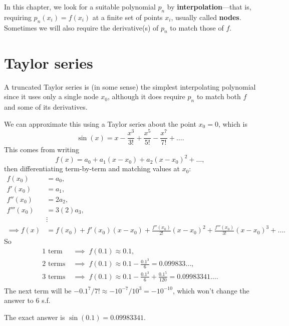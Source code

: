\documentclass[
  letterpaper,
  DIV=11,
  numbers=noendperiod]{scrreprt}
\begin{document}
In this chapter, we look for a suitable polynomial \(p_n\) by
\textbf{interpolation}---that is, requiring \(p_n(x_i) = f(x_i)\) at a
finite set of points \(x_i\), usually called \textbf{nodes}. Sometimes
we will also require the derivative(s) of \(p_n\) to match those of
\(f\).

\section*{Taylor series}\label{taylor-series}


A truncated Taylor series is (in some sense) the simplest interpolating
polynomial since it uses only a single node \(x_0\), although it does
require \(p_n\) to match both \(f\) and some of its derivatives.

We can approximate this using a Taylor series about the point \(x_0=0\),
which is \[
\sin(x) = x - \frac{x^3}{3!} + \frac{x^5}{5!} - \frac{x^7}{7!} + \ldots.
\] This comes from writing \[
f(x) = a_0 + a_1(x-x_0) + a_2(x-x_0)^2 + \ldots,
\] then differentiating term-by-term and matching values at \(x_0\):
\begin{align*}
f(x_0) &= a_0,\\
f'(x_0) &= a_1,\\
f''(x_0) &= 2a_2,\\
f'''(x_0) &= 3(2)a_3,\\
&\vdots\\
\implies f(x) &= f(x_0) + f'(x_0)(x-x_0) + \frac{f''(x_0)}{2!}(x-x_0)^2 + \frac{f'''(x_0)}{3!}(x-x_0)^3 + \ldots.
\end{align*} So \begin{align*}
\textrm{1 term} \;&\implies\; f(0.1) \approx 0.1,\\
\textrm{2 terms} \;&\implies\; f(0.1) \approx 0.1 - \frac{0.1^3}{6} = 0.099833\ldots,\\
\textrm{3 terms} \;&\implies\; f(0.1) \approx 0.1 - \frac{0.1^3}{6} + \frac{0.1^5}{120} = 0.09983341\ldots.\\
\end{align*} The next term will be
\(-0.1^7/7! \approx -10^{-7}/10^3 = -10^{-10}\), which won't change the
answer to 6 s.f.

\begin{tcolorbox}[enhanced jigsaw, arc=.35mm, toprule=.15mm, colframe=quarto-callout-note-color-frame, left=2mm, toptitle=1mm, titlerule=0mm, breakable, opacityback=0, bottomtitle=1mm, title=\textcolor{quarto-callout-note-color}{\faInfo}\hspace{0.5em}{Note}, rightrule=.15mm, opacitybacktitle=0.6, colbacktitle=quarto-callout-note-color!10!white, colback=white, leftrule=.75mm, bottomrule=.15mm, coltitle=black]

The exact answer is \(\sin(0.1)=0.09983341\).

\end{tcolorbox}
\end{document}

